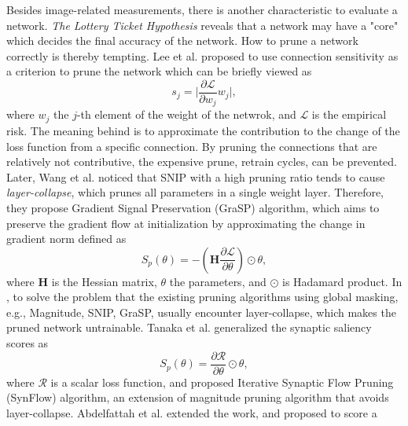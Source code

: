 \documentclass[sigconf]{acmart}
\begin{document}
    Besides image-related measurements, there is another characteristic to evaluate a network. 
    \textit{The Lottery Ticket Hypothesis} \cite{frankle2019lottery} reveals that a 
    network may have a "core" which decides the final accuracy of the network. 
    How to prune a network correctly is thereby tempting. Lee et al. 
    \cite{lee2019snip} proposed to use connection sensitivity as a criterion to prune 
    the network which can be briefly viewed as 
    \begin{equation}
        \label{equ:snip_connection_sensitivity}
        s_j=\lvert \frac{\partial \mathcal L}{\partial w_j}w_j\rvert,
    \end{equation}
    where $w_j$ the $j$-th element of the weight of the netwrok, and $\mathcal L$ is 
    the empirical risk. The meaning behind is to approximate the contribution 
    to the change of the loss function from a specific connection. By pruning the 
    connections that are relatively not contributive, the expensive prune, retrain 
    cycles, can be prevented. 
    Later, Wang et al. \cite{wang2020picking} noticed that SNIP with a high pruning ratio 
    tends to cause \textit{layer-collapse}, which prunes all parameters in a single weight 
    layer. Therefore, they propose Gradient Signal Preservation (GraSP) algorithm, which 
    aims to preserve the gradient flow at initialization by approximating the change in 
    gradient norm defined as 
    \begin{equation}
        \label{equ:grap}
        S_p(\theta)=-(\textbf{H}\frac{\partial \mathcal L}{\partial \theta})\odot\theta,
    \end{equation}
    where $\textbf{H}$ is the Hessian matrix, $\theta$ the parameters, and $\odot$ is Hadamard product. 
    In \cite{tanaka2020pruning}, to solve the problem that the existing pruning algorithms using 
    global masking, e.g., Magnitude, SNIP, GraSP, usually encounter layer-collapse, which makes 
    the pruned network untrainable. 
    Tanaka et al. generalized the synaptic saliency scores as 
    \begin{equation}
        \label{equ:synflow}
        S_p(\theta)=\frac{\partial \mathcal R}{\partial \theta}\odot\theta,
    \end{equation}
    where $\mathcal R$ is a scalar loss function, and proposed Iterative Synaptic Flow Pruning (SynFlow) 
    algorithm, an extension of magnitude pruning algorithm that avoids layer-collapse. 
    Abdelfattah et al. \cite{abdelfattah2021zerocost} extended the work, and proposed to score a 
\end{document}
